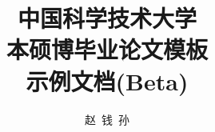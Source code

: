 \documentclass[master,euler,twoside,openright]{ustcthesis}
\title{中国科学技术大学\\本硕博毕业论文模板\\示例文档(Beta)}%
\author{赵\ 钱\ 孙}
\begin{document}
  \maketitle

\frontmatter
\makeatletter
\ifustc@bachelor
	
	
	\tableofcontents

	\ustclot
	\ustclof
	\ustcloa
	
\else
	\tableofcontents

	\ustclot
	\ustclof
	\ustcloa
	
\fi
\makeatother

\mainmatter

  
  
  

\backmatter

  
  \nocite{*} %

  \begin{appendix}
    
  \end{appendix}

  \makeatletter
  \ifustc@bachelor\relax\else
    
  \fi
  \makeatother
\end{document}
